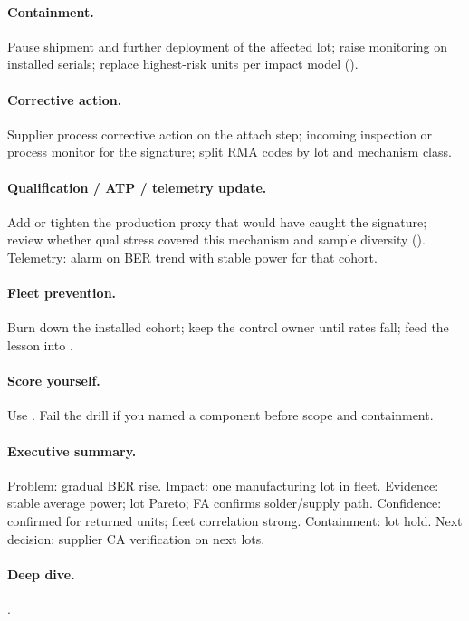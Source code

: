\paragraph{Containment.}
Pause shipment and further deployment of the affected lot; raise monitoring on
installed serials; replace highest-risk units per impact model
().

\paragraph{Corrective action.}
Supplier process corrective action on the attach step; incoming inspection or
process monitor for the signature; split RMA codes by lot and mechanism class.

\paragraph{Qualification / ATP / telemetry update.}
Add or tighten the production proxy that would have caught the signature;
review whether qual stress covered this mechanism and sample diversity
(). Telemetry: alarm on BER trend
with stable power for that cohort.

\paragraph{Fleet prevention.}
Burn down the installed cohort; keep the control owner until rates fall; feed
the lesson into .

\paragraph{Score yourself.}
Use . Fail the drill if you
named a component before scope and containment.

\paragraph{Executive summary.}
Problem: gradual BER rise. Impact: one manufacturing lot in fleet. Evidence:
stable average power; lot Pareto; FA confirms solder/supply path.
Confidence: confirmed for returned units; fleet correlation strong.
Containment: lot hold. Next decision: supplier CA verification on next lots.

\paragraph{Deep dive.}
.

